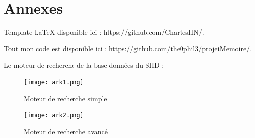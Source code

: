 \appendix
\part*{Annexes}
\pagestyle{myheadings}

Template LaTeX disponible ici : \url{https://github.com/ChartesHN/}.

Tout mon code est disponible ici : \url{https://github.com/the0phil3/projetMemoire/}.

Le moteur de recherche de la base données du SHD : 
\begin{figure}[h]
    \centering
    \texttt{[image: ark1.png]}
    \caption{Moteur de recherche simple}
    \label{fig:Arkothèque 1}
\end{figure}
\begin{figure}[h]
    \centering
    \texttt{[image: ark2.png]}
    \caption{Moteur de recherche avancé}
    \label{fig:Arkothèque 2}
\end{figure}

